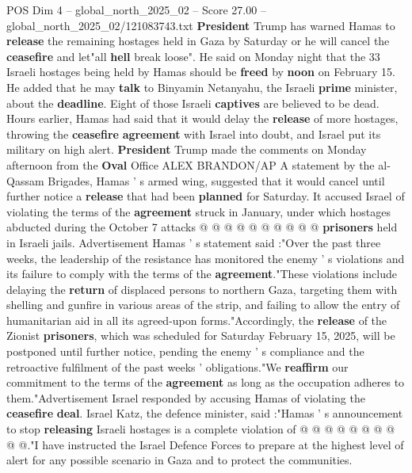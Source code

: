 \begin{textsample}{POS Dim 4 – global\_north\_2025\_02 – Score 27.00 – global\_north\_2025\_02/121083743.txt}  \label{ex:f4_pos_058}
\textbf{President} Trump has warned Hamas to \textbf{release} the remaining hostages held in Gaza by Saturday or he will cancel the \textbf{ceasefire} and let"all \textbf{hell} break loose".
He said on Monday night that the 33 Israeli hostages being held by Hamas should be \textbf{freed} by \textbf{noon} on February 15.
He added that he may \textbf{talk} to Binyamin Netanyahu, the Israeli \textbf{prime} minister, about the \textbf{deadline}.
Eight of those Israeli \textbf{captives} are believed to be dead.
Hours earlier, Hamas had said that it would delay the \textbf{release} of more hostages, throwing the \textbf{ceasefire} \textbf{agreement} with Israel into doubt, and Israel put its military on high alert. \textbf{President} Trump made the comments on Monday afternoon from the \textbf{Oval} Office ALEX BRANDON/AP A statement by the al-Qassam Brigades, Hamas ' s armed wing, suggested that it would cancel until further notice a \textbf{release} that had been \textbf{planned} for Saturday.
It accused Israel of violating the terms of the \textbf{agreement} struck in January, under which hostages abducted during the October 7 attacks @ @ @ @ @ @ @ @ @ @ \textbf{prisoners} held in Israeli jails.
Advertisement Hamas ' s statement said :"Over the past three weeks, the leadership of the resistance has monitored the enemy ' s violations and its failure to comply with the terms of the \textbf{agreement}."These violations include delaying the \textbf{return} of displaced persons to northern Gaza, targeting them with shelling and gunfire in various areas of the strip, and failing to allow the entry of humanitarian aid in all its agreed-upon forms."Accordingly, the \textbf{release} of the Zionist \textbf{prisoners}, which was scheduled for Saturday February 15, 2025, will be postponed until further notice, pending the enemy ' s compliance and the retroactive fulfilment of the past weeks ' obligations."We \textbf{reaffirm} our commitment to the terms of the \textbf{agreement} as long as the occupation adheres to them."Advertisement Israel responded by accusing Hamas of violating the \textbf{ceasefire} \textbf{deal}.
Israel Katz, the defence minister, said :"Hamas ' s announcement to stop \textbf{releasing} Israeli hostages is a complete violation of @ @ @ @ @ @ @ @ @ @."I have instructed the Israel Defence Forces to prepare at the highest level of alert for any possible scenario in Gaza and to protect the communities.

\end{textsample}
